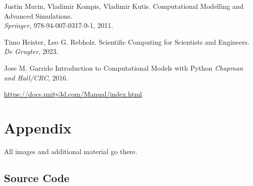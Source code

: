 \documentclass[conference,compsoc]{IEEEtran}
\begin{document}
\begin{thebibliography}{1}
	Justin Murin, Vladimir Kompis, Vladimir Kutis.
	\newblock Computational Modelling and Advanced Simulations. \\
	\newblock \emph{Springer}, 978-94-007-0317-9-1, 2011.
	
	Timo Heister, Leo G. Rebholz.
	\newblock Scientific Computing for Scientists and Engineers.
	\newblock \emph{De Gruyter}, 2023.
	
	Jose M. Garrido
	\newblock Introduction to Computational Models with Python
	\newblock \emph{Chapman and Hall/CRC}, 2016.
	
	\newblock \href{https://docs.unity3d.com/Manual/index.html}{https://docs.unity3d.com/Manual/index.html}

\end{thebibliography}
\newpage 
\section{Appendix}
All images and additional material go there.

\subsection{Source Code}

\begin{lstlisting}

\end{lstlisting}
\end{document}
